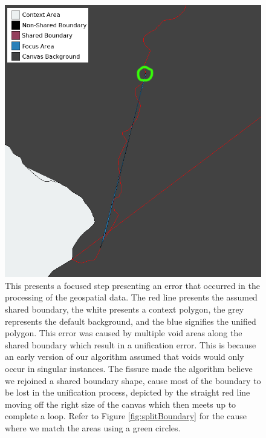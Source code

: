 \begin{figure}
\includegraphics[width=1\textwidth]{images/ch6/multipleVoids3}
\caption{This presents a focused step presenting an error that occurred in the processing of the geospatial data. The red line presents the assumed shared boundary, the white presents a context polygon, the grey represents the default background, and the blue signifies the unified polygon. This error was caused by multiple void areas along the shared boundary which result in a unification error. This is because an early version of our algorithm assumed that voids would only occur in singular instances. The fissure made the algorithm believe we rejoined a shared boundary shape, cause most of the boundary to be lost in the unification process, depicted by the straight red line moving off the right size of the canvas which then meets up to complete a loop. Refer to Figure \ref{fig:splitBoundary} for the cause where we match the areas using a green circles.} \label{fig:errorVoids}
\end{figure}

